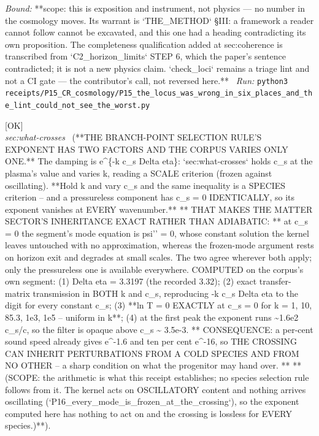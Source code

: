\begin{description}
 \emph{Bound:} **scope: this is exposition and instrument, not physics --- no number in the cosmology moves. Its warrant is `THE\_METHOD` \S{}III: a framework a reader cannot follow cannot be excavated, and this one had a heading contradicting its own proposition. The completeness qualification added at sec:coherence is transcribed from `C2\_horizon\_limits` STEP 6, which the paper's sentence contradicted; it is not a new physics claim. `check\_loci` remains a triage lint and not a CI gate --- the contributor's call, not reversed here.**
\ \emph{Run:} \texttt{python3 receipts/P15\_CR\_cosmology/P15\_the\_locus\_was\_wrong\_in\_six\_places\_and\_the\_lint\_could\_not\_see\_the\_worst.py}
\item[\label{rcpt:P15_the_filter_is_a_sound_speed_filter}\texttt{P15\_the\_filter\_is\_a\_sound\_speed\_filter}]\hfill\textsf{[OK]}\\
\textit{sec:what-crosses} \ (**THE BRANCH-POINT SELECTION RULE'S EXPONENT HAS TWO FACTORS AND THE CORPUS VARIES ONLY ONE.** The damping is e\textasciicircum{}\{-k c\_s \textbar{}Delta eta\textbar{}\}: `sec:what-crosses` holds c\_s at the plasma's value and varies k, reading a SCALE criterion (frozen against oscillating). **Hold k and vary c\_s and the same inequality is a SPECIES criterion -- and a pressureless component has c\_s = 0 IDENTICALLY, so its exponent vanishes at EVERY wavenumber.** ** THAT MAKES THE MATTER SECTOR'S INHERITANCE EXACT RATHER THAN ADIABATIC: ** at c\_s = 0 the segment's mode equation is psi'' = 0, whose constant solution the kernel leaves untouched with no approximation, whereas the frozen-mode argument rests on horizon exit and degrades at small scales. The two agree wherever both apply; only the pressureless one is available everywhere. COMPUTED on the corpus's own segment: (1) \textbar{}Delta eta\textbar{} = 3.3197 (the recorded 3.32); (2) exact transfer-matrix transmission in BOTH k and c\_s, reproducing -k c\_s \textbar{}Delta eta\textbar{} to the digit for every constant c\_s; (3) **ln T = 0 EXACTLY at c\_s = 0 for k = 1, 10, 85.3, 1e3, 1e5 -- uniform in k**; (4) at the first peak the exponent runs \textasciitilde{}1.6e2 c\_s/c, so the filter is opaque above c\_s \textasciitilde{} 3.5e-3. ** CONSEQUENCE: a per-cent sound speed already gives e\textasciicircum{}-1.6 and ten per cent e\textasciicircum{}-16, so THE CROSSING CAN INHERIT PERTURBATIONS FROM A COLD SPECIES AND FROM NO OTHER -- a sharp condition on what the progenitor may hand over. ** **(SCOPE: the arithmetic is what this receipt establishes; no species selection rule follows from it. The kernel acts on OSCILLATORY content and nothing arrives oscillating (`P16\_every\_mode\_is\_frozen\_at\_the\_crossing`), so the exponent computed here has nothing to act on and the crossing is lossless for EVERY species.)**). 

\end{description}
